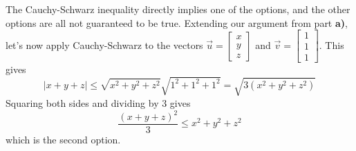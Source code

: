 \documentclass[11pt]{article}
\begin{document}
\begin{prob}[(10 pts)]
\begin{subprob}
\begin{solution}
The Cauchy-Schwarz inequality directly implies one of the options, and the other options are all not guaranteed to be true. Extending our argument from part \textbf{a)}, let's now apply Cauchy-Schwarz to the vectors $\vec u=\begin{bmatrix}x\\y\\z\end{bmatrix}$ and $\vec v=\begin{bmatrix}1\\1\\1\end{bmatrix}$. This gives
\[
|x+y+z|\le \sqrt{x^2+y^2+z^2} \sqrt{1^2+1^2+1^2} = \sqrt{3(x^2+y^2+z^2)}
\]
Squaring both sides and dividing by $3$ gives
\[
\frac{(x+y+z)^2}{3}\le x^2+y^2+z^2
\]
which is the second option.
\end{solution}
\end{subprob}
\end{prob}

\end{document}
